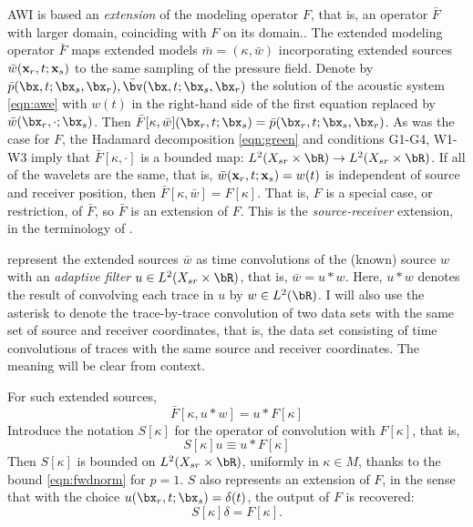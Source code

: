 AWI is based an {\em extension} of the modeling operator $F$, that is,
an operator ${\bar F}$ with larger domain, coinciding with $F$ on its domain..
The extended modeling operator ${\bar F}$ maps extended models
$\bar{m}=(\kappa,\bar{w})$ incorporating extended sources
$\bar{w}({\bf x}_r,t;{\bf x}_s)$ to the same sampling of the pressure
field. Denote by $\bar{p}(\bx,t;\bx_s,\bx_r), \bar{\bv}(\bx,t;\bx_s,\bx_r)$
the solution of the acoustic system \ref{eqn:awe} with $w(t)$ in the
right-hand side of the first equation replaced by
$\bar{w}(\bx_r,\cdot;\bx_s)$. Then
$\bar{F}[\kappa,\bar{w}](\bx_r,t;\bx_s) =
\bar{p}(\bx_r,t;\bx_s,\bx_r)$. As was the case for $F$, the Hadamard
decomposition \ref{eqn:green} and conditions G1-G4, W1-W3 imply that
$\bar{F}[\kappa, \cdot]$ is a bounded map: $L^2(X_{sr} \times \bR)
\rightarrow L^2(X_{sr} \times \bR)$. If all  
of the wavelets are the same, that is, ${\bar w}({\bf  
  x}_r,t;{\bf x}_s) = w(t)$ is independent of source and receiver  
position, then ${\bar F}[\kappa,\bar{w}] = F[\kappa]$. That is, $F$ is a special
case, or restriction, of ${\bar F}$, so ${\bar F}$ is an extension of
$F$. This is the {\em source-receiver} extension, in the terminology of \cite{HuangSymes2015SEG}.

\cite{Warner:16} represent the extended sources $\bar{w}$ as time convolutions of the
(known) source $w$ with an {\em adaptive filter} $u \in L^2(X_{sr}
\times \bR)$, that is, $\bar{w}=u * w$.
Here, $u*w$ denotes the result of convolving each trace in $u$ by $w
\in L^2(\bR)$. I
will also use the asterisk to denote the trace-by-trace convolution
of two data sets with the same set of source and receiver coordinates,
that is, the data set consisting of time convolutions of traces with the same source
and receiver coordinates. The meaning will be clear from context.

For such extended sources,
\[
  \bar{F}[\kappa,u*w] = u*F[\kappa]
\]
Introduce the notation $S[\kappa]$ for the operator of convolution
with $F[\kappa]$, that is,
\begin{equation}
  \label{eqn:sdef}
  S[\kappa]u \equiv u*F[\kappa]
\end{equation}
Then $S[\kappa]$ is bounded on $L^2(X_{sr} \times \bR)$, uniformly in
$\kappa \in M$, thanks to
the bound \ref{eqn:fwdnorm} for $p=1$. $S$ also represents an
extension of $F$, in the sense that with the choice
$u(\bx_r,t;\bx_s)=\delta(t)$, the output of $F$ is recovered:
\begin{equation}
  \label{eqn:sconsist}
  S[\kappa]\delta = F[\kappa].
\end{equation}

